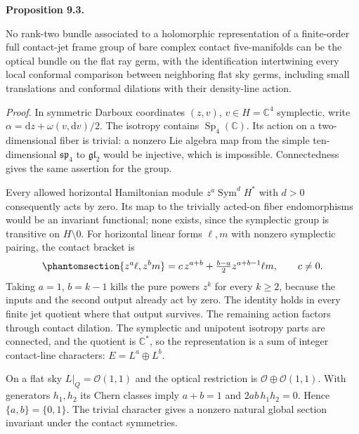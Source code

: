 \documentclass[
  english,
  11pt,
  reqno]{amsart}
\makeatletter
\newcounter{none} %
\newcommand{\pandocstatementheading}[1]{%
  \par\addpenalty{\@beginparpenalty}%
  \addvspace{.5\baselineskip plus .2\baselineskip minus .2\baselineskip}%
  {\normalfont\bfseries #1\par}%
  \nobreak\@afterindenttrue\@afterheading
}
\makeatother
\begin{document}
\pandocstatementheading{\protect{}\label{prop:gg-contact-local-optical-obstruction}Proposition 9.3.}

No rank-two bundle associated to a holomorphic representation of a
finite-order full contact-jet frame group of bare complex contact
five-manifolds can be the optical bundle on the flat ray germ, with the
identification intertwining every local conformal comparison between
neighboring flat sky germs, including small translations and conformal
dilations with their density-line action.

\emph{Proof.} In symmetric Darboux coordinates \((z,v)\),
\(v\in H=\mathbb C^4\) symplectic, write
\(\alpha=\mathrm dz+\omega(v,\mathrm dv)/2\). The isotropy contains
\(\operatorname{Sp}_4(\mathbb C)\). Its action on a two-dimensional
fiber is trivial: a nonzero Lie algebra map from the simple
ten-dimensional \(\mathfrak{sp}_4\) to \(\mathfrak{gl}_2\) would be
injective, which is impossible. Connectedness gives the same assertion
for the group.

Every allowed horizontal Hamiltonian module
\(z^a\operatorname{Sym}^dH^*\) with \(d>0\) consequently acts by zero.
Its map to the trivially acted-on fiber endomorphisms would be an
invariant functional; none exists, since the symplectic group is
transitive on \(H\setminus0\). For horizontal linear forms \(\ell,m\)
with nonzero symplectic pairing, the contact bracket is
\begin{equation}\protect\phantomsection\label{eq:gg-contact-isotropy-bracket}{
 \{z^a\ell,z^bm\}
  =c\,z^{a+b}
       +\tfrac{b-a}{2}z^{a+b-1}\ell m,\qquad c\ne0 .
}\end{equation} Taking \(a=1\), \(b=k-1\) kills the pure powers \(z^k\)
for every \(k\ge2\), because the inputs and the second output already
act by zero. The identity holds in every finite jet quotient where that
output survives. The remaining action factors through contact dilation.
The symplectic and unipotent isotropy parts are connected, and the
quotient is \(\mathbb C^*\), so the representation is a sum of integer
contact-line characters: \(E=L^a\oplus L^b\).

On a flat sky \(L|_Q=\mathcal O(1,1)\) and the optical restriction is
\(\mathcal O\oplus\mathcal O(1,1)\). With generators \(h_1,h_2\) its
Chern classes imply \(a+b=1\) and \(2ab\,h_1h_2=0\). Hence
\(\{a,b\}=\{0,1\}\). The trivial character gives a nonzero natural
global section invariant under the contact symmetries.
\end{document}
